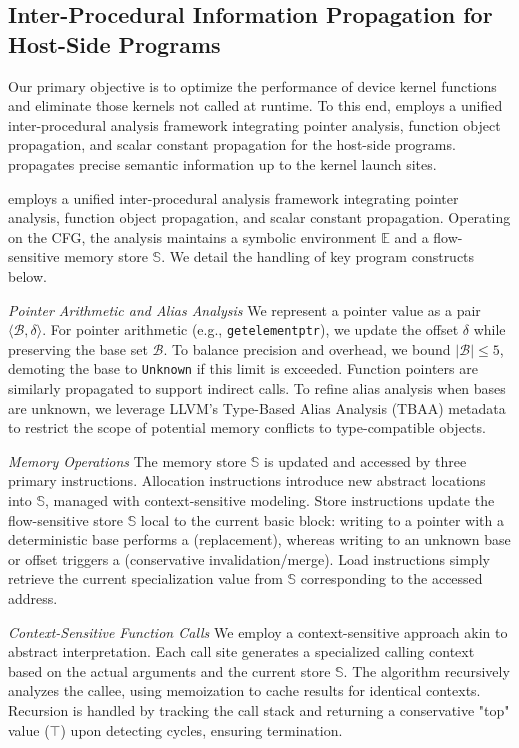 \subsection{Inter-Procedural Information Propagation for Host-Side Programs}\label{sec:design:propagation}

Our primary objective is to optimize the performance of device kernel functions and eliminate those kernels not called at runtime. 
To this end, \mysys \mysys employs a unified inter-procedural analysis framework integrating pointer analysis, function object propagation, and scalar constant propagation for the host-side programs.
\mysys propagates precise semantic information up to the kernel launch sites.

\mysys employs a unified inter-procedural analysis framework integrating pointer analysis, function object propagation, and scalar constant propagation.
Operating on the CFG, the analysis maintains a symbolic environment $\mathbb{E}$ and a flow-sensitive memory store $\mathbb{S}$.
We detail the handling of key program constructs below.

\textit{Pointer Arithmetic and Alias Analysis}
We represent a pointer value as a pair $\langle \mathcal{B}, \delta \rangle$. 
For pointer arithmetic (e.g., \texttt{getelementptr}), we update the offset $\delta$ while preserving the base set $\mathcal{B}$.
To balance precision and overhead, we bound $|\mathcal{B}| \le 5$, demoting the base to \texttt{Unknown} if this limit is exceeded.
Function pointers are similarly propagated to support indirect calls.
To refine alias analysis when bases are unknown, we leverage LLVM's Type-Based Alias Analysis (TBAA) metadata to restrict the scope of potential memory conflicts to type-compatible objects.

\textit{Memory Operations}
The memory store $\mathbb{S}$ is updated and accessed by three primary instructions.
Allocation instructions introduce new abstract locations into $\mathbb{S}$, managed with context-sensitive modeling.
Store instructions update the flow-sensitive store $\mathbb{S}$ local to the current basic block: writing to a pointer with a deterministic base performs a  (replacement), whereas writing to an unknown base or offset triggers a  (conservative invalidation/merge).
Load instructions simply retrieve the current specialization value from $\mathbb{S}$ corresponding to the accessed address.

\textit{Context-Sensitive Function Calls}
We employ a context-sensitive approach akin to abstract interpretation.
Each call site generates a specialized calling context based on the actual arguments and the current store $\mathbb{S}$.
The algorithm recursively analyzes the callee, using memoization to cache results for identical contexts.
Recursion is handled by tracking the call stack and returning a conservative "top" value ($\top$) upon detecting cycles, ensuring termination.

